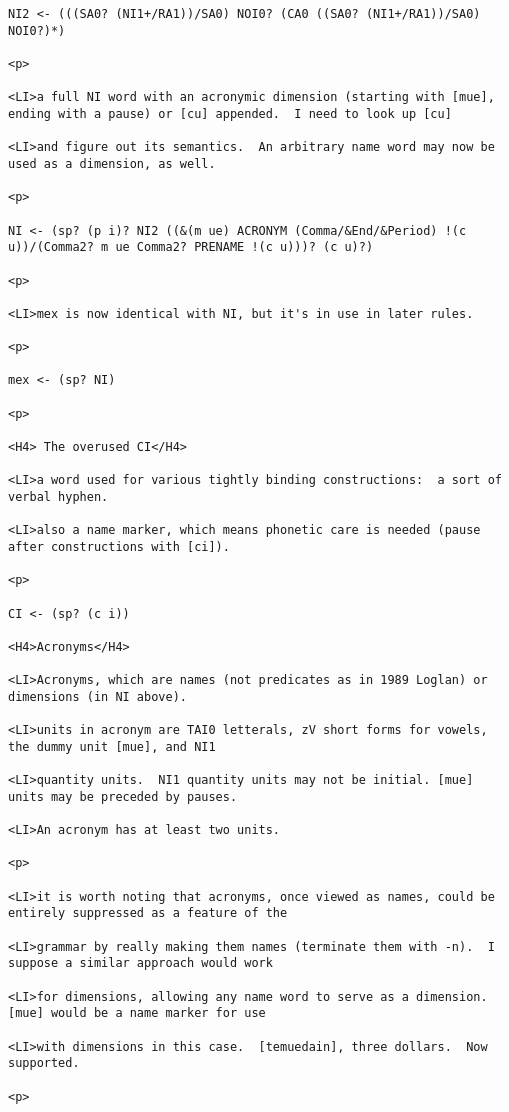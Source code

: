 \documentclass[12pt]{article}
\begin{document}
\begin{lstlisting}
NI2 <- (((SA0? (NI1+/RA1))/SA0) NOI0? (CA0 ((SA0? (NI1+/RA1))/SA0) NOI0?)*)

<p>

<LI>a full NI word with an acronymic dimension (starting with [mue], ending with a pause) or [cu] appended.  I need to look up [cu]

<LI>and figure out its semantics.  An arbitrary name word may now be used as a dimension, as well.

<p>

NI <- (sp? (p i)? NI2 ((&(m ue) ACRONYM (Comma/&End/&Period) !(c u))/(Comma2? m ue Comma2? PRENAME !(c u)))? (c u)?)

<p>

<LI>mex is now identical with NI, but it's in use in later rules.

<p>

mex <- (sp? NI)

<p>

<H4> The overused CI</H4>

<LI>a word used for various tightly binding constructions:  a sort of verbal hyphen.

<LI>also a name marker, which means phonetic care is needed (pause after constructions with [ci]).

<p>

CI <- (sp? (c i))

<H4>Acronyms</H4>

<LI>Acronyms, which are names (not predicates as in 1989 Loglan) or dimensions (in NI above).

<LI>units in acronym are TAI0 letterals, zV short forms for vowels, the dummy unit [mue], and NI1

<LI>quantity units.  NI1 quantity units may not be initial. [mue] units may be preceded by pauses.

<LI>An acronym has at least two units.

<p>

<LI>it is worth noting that acronyms, once viewed as names, could be entirely suppressed as a feature of the

<LI>grammar by really making them names (terminate them with -n).  I suppose a similar approach would work

<LI>for dimensions, allowing any name word to serve as a dimension.  [mue] would be a name marker for use

<LI>with dimensions in this case.  [temuedain], three dollars.  Now supported.

<p>


\end{lstlisting}
\end{document}
